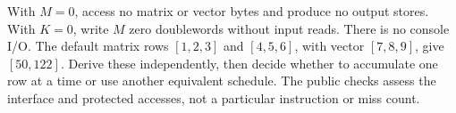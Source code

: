 With $M=0$, access no matrix or vector bytes and produce no output stores. With
$K=0$, write $M$ zero doublewords without input reads. There is no console I/O.
The default matrix rows $[1,2,3]$ and $[4,5,6]$, with vector $[7,8,9]$, give
$[50,122]$. Derive these independently, then decide whether to accumulate one
row at a time or use another equivalent schedule. The public checks assess the
interface and protected accesses, not a particular instruction or miss count.
